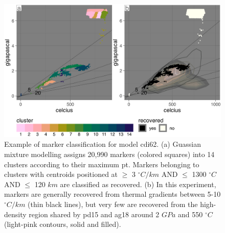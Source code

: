 \begin{figure}[htbp]

{\centering \includegraphics[width=1\linewidth,]{assets/figs/chpt4/cdi62_k14_class} 

}

\caption[Example of marker classification for model cdi62]{Example of marker classification for model cdi62. (a) Guassian mixture modelling assigns 20,990 markers (colored squares) into 14 clusters according to their maximum \gls{pt}. Markers belonging to clusters with centroids positioned at \(\geq\) 3 \(^\circ C/km\) AND \(\leq\) 1300 \(^\circ C\) AND \(\leq\) 120 \(km\) are classified as recovered. (b) In this experiment, markers are generally recovered from thermal gradients between 5-10 \(^\circ C/km\) (thin black lines), but very few are recovered from the high-density region shared by pd15 and ag18 around 2 \(GPa\) and 550 \(^\circ C\) (light-pink contours, solid and filled).}\label{fig:class}
\end{figure}



